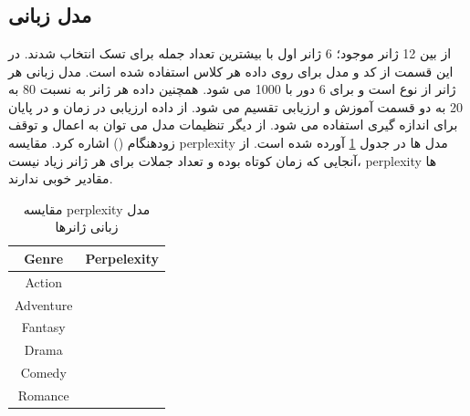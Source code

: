 \section{}

\subsection{مدل زبانی}
از بین 12 ژانر موجود؛ 6 ژانر اول با بیشترین تعداد جمله برای تسک 
انتخاب شدند. در این قسمت از کد
\cite{Ref1}
و مدل 
برای 
روی داده هر کلاس  استفاده شده است. مدل زبانی هر ژانر از نوع
است و برای 6 دور با
1000
می شود. همچنین داده هر ژانر به نسبت 80 به 20 به دو قسمت آموزش و ارزیابی تقسیم می شود. از داده ارزیابی در زمان 
و در پایان برای اندازه گیری
استفاده می شود. از دیگر تنظیمات مدل می توان به اعمال
و توقف زودهنگام () اشاره کرد. مقایسه perplexity مدل ها در جدول
\ref{tab51}
آورده شده است. از آنجایی که زمان 
کوتاه بوده و تعداد جملات برای هر ژانر زیاد نیست، perplexity ها مقادیر خوبی ندارند.


\begin{center}
	\begin{table}
		\begin{center}
		\begin{tabular}{ |c|c| }
		\hline
		\textbf{Genre} & \textbf{Perpelexity} \\ 
		\hline
		Action  & $ $ \\
		\hline
		Adventure  & $ $ \\
		\hline
		Fantasy  & $ $ \\
		\hline
		Drama & $ $ \\
		\hline
		Comedy  & $ $ \\
		\hline
		Romance  & $ $ \\
		\hline
	\end{tabular}
\caption{\label{tab51}مقایسه perplexity مدل زبانی ژانرها }
\end{center}
\end{table}
\end{center}

